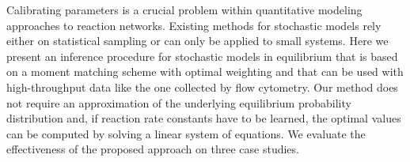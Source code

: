 Calibrating parameters is a crucial problem within quantitative
modeling approaches to reaction networks. Existing methods for
stochastic models rely either on statistical sampling or can only be
applied to small systems. Here we present an inference procedure for
stochastic models in equilibrium that is based on a moment matching
scheme with optimal weighting and that can be used with high-throughput data 
like the one collected by flow cytometry. 
Our method does not require an approximation of the underlying equilibrium
  probability distribution and, if reaction rate constants have to be learned,
  the optimal values can be computed by solving a linear system of
  equations.
  We evaluate the effectiveness of the proposed approach on 
  three case studies.